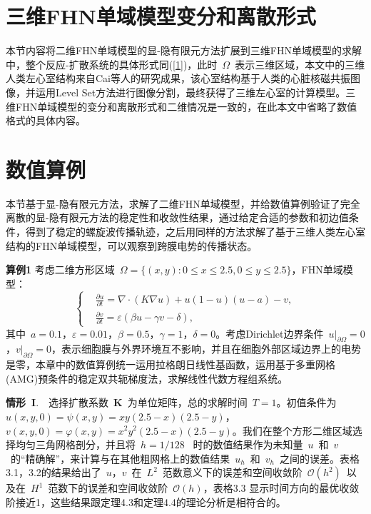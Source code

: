 \documentclass[twoside,UTF8]{nputhesis}
\begin{document}
\section{三维FHN单域模型变分和离散形式}

本节内容将二维FHN单域模型的显-隐有限元方法扩展到三维FHN单域模型的求解中，整个反应-扩散系统的具体形式同(\ref{1})，此时~$\Omega$~表示三维区域，本文中的三维人类左心室结构来自Cai等人\cite{Caili2015}的研究成果，该心室结构基于人类的心脏核磁共振图像，并运用Level Set方法进行图像分割，最终获得了三维左心室的计算模型。三维FHN单域模型的变分和离散形式和二维情况是一致的，在此本文中省略了数值格式的具体内容。

\section{数值算例}
本节基于显-隐有限元方法，求解了二维FHN单域模型，并给数值算例验证了完全离散的显-隐有限元方法的稳定性和收敛性结果，通过给定合适的参数和初边值条件，得到了稳定的螺旋波传播轨迹，之后用同样的方法求解了基于三维人类左心室结构的FHN单域模型，可以观察到跨膜电势的传播状态。

\textbf{算例1} 考虑二维方形区域~$\Omega=\{(x,y):0\leq x\leq2.5, 0\leq y\leq2.5\}$，FHN单域模型：
\begin{equation}
\left\{\begin{aligned}&\frac{\partial u}{\partial t}=\nabla\cdot(K\nabla u)+u(1-u)(u-a)-v,\\
&\frac{\partial v}{\partial t}=\varepsilon(\beta u-\gamma v-\delta),\end{aligned}\right.
\label{fhn}
\end{equation}
其中~$a = 0.1$，$\varepsilon = 0.01$，$\beta = 0.5$，$\gamma= 1$，$\delta= 0$。考虑Dirichlet边界条件~$u|_{\partial\Omega}=0$，$ v|_{\partial\Omega}=0$，表示细胞膜与外界环境互不影响，并且在细胞外部区域边界上的电势是零，本章中的数值算例统一运用拉格朗日线性基函数，运用基于多重网格(AMG)预条件的稳定双共轭梯度法，求解线性代数方程组系统。

\textbf{情形~I}.~~选择扩散系数~$\textbf{K}$~为单位矩阵，总的求解时间~$T=1$。初值条件为~ $u(x,y,0)=\psi(x,y)=xy(2.5-x)(2.5-y)$，$v(x,y,0)=\varphi(x,y)=x^2y^2(2.5-x)(2.5-y)$。我们在整个方形二维区域选择均匀三角网格剖分，并且将~$h = 1/128$~ 时的数值结果作为未知量~$u$~和~$v$~的“精确解”，来计算与在其他粗网格上的数值结果~$u_h$~和~$v_h$~之间的误差。表格3.1，3.2的结果给出了~$u$，$v$~在~$L^2$~范数意义下的误差和空间收敛阶~$\mathcal {O}(h^2)$~以及在~$H^1$~范数下的误差和空间收敛阶~$\mathcal {O}(h)$，表格3.3 显示时间方向的最优收敛阶接近1，这些结果跟定理4.3和定理4.4的理论分析是相符合的。
\end{document}
